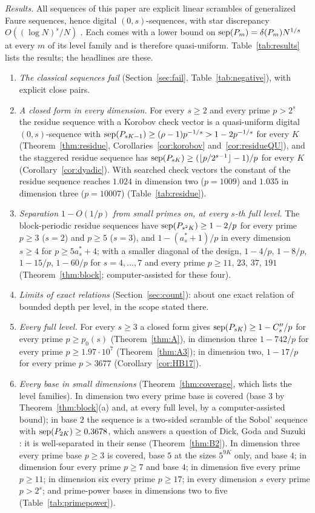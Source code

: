 \emph{Results.} All sequences of this paper are explicit linear scrambles of generalized Faure sequences, hence digital $(0,s)$-sequences, with star discrepancy $O((\log N)^s/N)$ \cite{Nie92}. Each comes with a lower bound on $\operatorname{sep}(P_m)=\delta(P_m)N^{1/s}$ at every $m$ of its level family and is therefore quasi-uniform. Table~\ref{tab:results} lists the results; the headlines are these.
\begin{enumerate}
\item \emph{The classical sequences fail} (Section~\ref{sec:fail}, Table~\ref{tab:negative}), with explicit close pairs.
\item \emph{A closed form in every dimension.} For every $s\ge2$ and every prime $p>2^s$ the residue sequence with a Korobov check vector is a quasi-uniform digital $(0,s)$-sequence with $\operatorname{sep}(P_{sK-1})\ge(\rho-1)p^{-1/s}>1-2p^{-1/s}$ for every $K$ (Theorem~\ref{thm:residue}, Corollaries~\ref{cor:korobov} and~\ref{cor:residueQU}), and the staggered residue sequence has $\operatorname{sep}(P_{sK})\ge(\lfloor p/2^{s-1}\rfloor-1)/p$ for every $K$ (Corollary~\ref{cor:dyadic}). With searched check vectors the constant of the residue sequence reaches $1.024$ in dimension two ($p=1009$) and $1.035$ in dimension three ($p=10007$) (Table~\ref{tab:residue}).
\item \emph{Separation $1-O(1/p)$ from small primes on, at every $s$-th full level.} The block-periodic residue sequences have $\operatorname{sep}(P_{s^2K})\ge1-2/p$ for every prime $p\ge3$ ($s=2$) and $p\ge5$ ($s=3$), and $1-(a^*_s+1)/p$ in every dimension $s\ge4$ for $p\ge5a^*_s+4$; with a smaller diagonal of the design, $1-4/p$, $1-8/p$, $1-15/p$, $1-60/p$ for $s=4,\dots,7$ and every prime $p\ge11$, $23$, $37$, $191$ (Theorem~\ref{thm:block}; computer-assisted for these four).
\item \emph{Limits of exact relations} (Section~\ref{sec:count}): about one exact relation of bounded depth per level, in the scope stated there.
\item \emph{Every full level.} For every $s\ge3$ a closed form gives $\operatorname{sep}(P_{sK})\ge1-C''_s/p$ for every prime $p\ge p_0(s)$ (Theorem~\ref{thm:A}), in dimension three $1-742/p$ for every prime $p\ge1.97\cdot10^7$ (Theorem~\ref{thm:A3}); in dimension two, $1-17/p$ for every prime $p>3677$ (Corollary~\ref{cor:HB17}).
\item \emph{Every base in small dimensions} (Theorem~\ref{thm:coverage}, which lists the level families). In dimension two every prime base is covered (base $3$ by Theorem~\ref{thm:block}(a) and, at every full level, by a computer-assisted bound); in base $2$ the sequence is a two-sided scramble of the Sobol' sequence with $\operatorname{sep}(P_{2K})\ge0.3678$, which answers a question of Dick, Goda and Suzuki \cite[Section~4.2]{DGS2}: it is well-separated in their sense \cite[Def.~3.8]{DGS2} (Theorem~\ref{thm:B2}). In dimension three every prime base $p\ge3$ is covered, base $5$ at the sizes $5^{9K}$ only, and base $4$; in dimension four every prime $p\ge7$ and base $4$; in dimension five every prime $p\ge11$; in dimension six every prime $p\ge17$; in every dimension $s$ every prime $p>2^s$; and prime-power bases in dimensions two to five (Table~\ref{tab:primepower}).
\end{enumerate}

